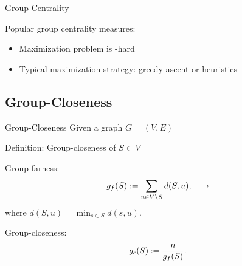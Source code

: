 \documentclass[10pt,titlepage,english,presentation]{beamer}
\renewenvironment{definition}[1]{\begin{block}{\vspace{-.5mm}\small Definition: #1}}{\end{block}}
\begin{document}
\begin{frame}[t]{Group Centrality}
{\begin{minipage}[t]{.45\textwidth}
Popular group centrality measures:\medskip

\begin{itemize}
\footnotesize
    \item Maximization problem is \np-hard
    \item Typical maximization strategy: greedy ascent or heuristics
\end{itemize}
\end{minipage}
}
\end{frame}


\subsection{Group-Closeness}

\begin{frame}[t]{Group-Closeness}
Given a graph $G = (V, E)$
\begin{definition}{Group-closeness of $S \subset V$}
\begin{minipage}[t]{.5\textwidth}
Group-farness:
\[
g_f(S) := \sum_{u \in V \setminus S}d(S, u),
\quad\to
\]
where $d(S, u) = \min_{s \in S}d(s, u)$.
\end{minipage}\hfill
\begin{minipage}[t]{.5\textwidth}
Group-closeness:
\[
g_c(S) := \frac{n}{g_f(S)}.
\]
\end{minipage}

\end{definition}

\end{frame}
\end{document}
